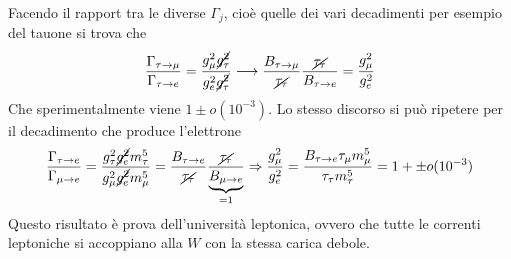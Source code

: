 \documentclass[12pt]{book}
\begin{document}
Facendo il rapport tra le diverse $\Gamma_j$, cioè quelle dei vari decadimenti per esempio del tauone si trova che 
\begin{gather}
	\frac{\Gamma_{\tau \rightarrow \mu}}{\Gamma_{\tau \rightarrow e}}= \frac{g_\mu^2 \cancel{ g_\tau^2}}{g_e^2 \cancel{g^2_\tau} } \longrightarrow \frac{B_{\tau \rightarrow \mu}}{\cancel {\tau_\tau}} \frac{\cancel{\tau_\tau}}{B_{\tau \rightarrow e}} = \frac{g^2_\mu}{g_e^2}
\end{gather}
Che sperimentalmente viene $1 \pm o (10^{-3})$. Lo stesso discorso si può ripetere per il decadimento che produce l'elettrone
\begin{gather}
	\frac{\Gamma_{\tau \rightarrow e}}{\Gamma_{\mu \rightarrow e}}= \frac{g_\tau^2 \cancel{ g_e^2} m_\tau^5}{g_\mu^2 \cancel{g^2_e} m_\mu^5} = \frac{B_{\tau \rightarrow e}}{\cancel {\tau_\tau}} \frac{\cancel{\tau_\tau}}{\underbrace{B_{\mu \rightarrow e}}_{=1}} \Rightarrow \frac{g^2_\mu}{g_e^2} = \frac{B_{\tau \rightarrow e } \tau_\mu m_\mu^5}{\tau_\tau m^5_\tau} = 1 +\pm o(10^{-3})
\end{gather}
Questo risultato è prova dell'università leptonica, ovvero che tutte le correnti leptoniche si accoppiano alla $W$ con la stessa carica debole.

\newpage
\end{document}
